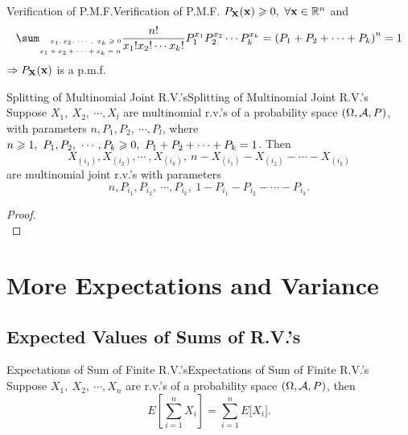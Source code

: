 \documentclass{elegantbook}
\begin{document}
\begin{remark}{Verification of P.M.F.}{Verification of P.M.F.}
\(P_{\mathbf{X}}(\mathbf{x}) \geqslant 0,\ \forall\mathbf{x} \in \mathbb{R}^{n}\) and
\[\sum_{\mbox{\tiny$\begin{aligned}
x_{1},x_{2},\,\cdots,\ x_{k} \gs 0 \\
x_{1} + x_{2} + \cdots + x_{k} = n \\
\end{aligned}$}}^{}{\frac{n!}{x_{1}!x_{2}!\cdots x_{k}!}P_{1}^{x_{1}}P_{2}^{x_{2}}\cdots P_{k}^{x_{k}}} = \left( P_{1} + P_{2} + \cdots + P_{k} \right)^{n} = 1\]
\(\Rightarrow P_{\mathbf{X}}(\mathbf{x})\) is a p.m.f.
\end{remark}

\begin{theorem}{Splitting of Multinomial Joint R.V.'s}{Splitting of Multinomial Joint R.V.'s}
Suppose \(X_{1},\ X_{2},\ \cdots,X_{l}\) are multinomial r.v.'s of a probability space $(\Omega,\mathcal{A}, P)$, with parameters \(n,P_{1},P_{2},\ \cdots,P_{l}\),
where \(n \geqslant 1,\ P_{1},P_{2},\ \cdots,P_{k} \geqslant 0,\ P_{1} + P_{2} + \cdots + P_{k} = 1\). Then
\[X_{(i_{1})},X_{(i_{2})},\cdots\ ,X_{\left( i_{k} \right)},\ n - X_{\left( i_{1} \right)} - X_{\left( i_{2} \right)} - \cdots - X_{\left( i_{k} \right)}\]
are multinomial joint r.v.'s with parameters \[n,P_{i_{1}},P_{i_{2}},\ \cdots,P_{i_{k}},\ 1 - P_{i_{1}} - P_{i_{2}} - \cdots - P_{i_{k}}.\]
\end{theorem}

\begin{proof}
\\[4cm]\vspace{0.01cm}
\end{proof}

\chapter{More Expectations and Variance}

\section{Expected Values of Sums of R.V.'s}

\begin{theorem}{Expectations of Sum of Finite R.V.'s}{Expectations of Sum of Finite R.V.'s}
Suppose \(X_{1},\ X_{2},\ \cdots,X_{n}\) are r.v.'s of a probability space $(\Omega,\mathcal{A}, P)$, then
\[E\left\lbrack \sum_{i = 1}^{n}X_{i} \right\rbrack = \sum_{i = 1}^{n}{E\lbrack X_{i}\rbrack}.\]
\end{theorem}
\end{document}
